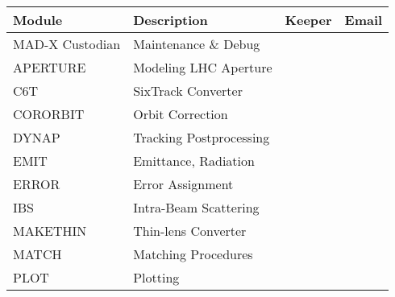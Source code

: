 %
\begin{table}[H]\vspace*{-6mm}\footnotesize
\begin{tabular}{l|l|l|l}
\hline
\textbf{Module}    &\textbf{Description}        &\textbf{Keeper}                     &\textbf{Email}            	 \\\hline
MAD-X Custodian    &Maintenance \& Debug        &{\color{green}{tba}}                            & {\color{red}{}}         \\\hline
APERTURE           &Modeling LHC Aperture       &{\color{green}{J.B.~Jeanneret}}                 & {\color{red}{Bernard.Jeanneret@cern.ch}}   \\ \hline                
C6T                &SixTrack Converter          &{\color{green}{F.~Schmidt}}                     & {\color{red}{Frank.Schmidt@cern.ch}}       \\\hline
CORORBIT           &Orbit Correction            &{\color{green}{W.~Herr}}                        & {\color{red}{Werner.Herr@cern.ch}}         \\\hline
DYNAP              &Tracking Postprocessing     &{\color{green}{F.~Zimmermann}}                  & {\color{red}{Frank.Zimmermann@cern.ch}}    \\\hline
EMIT               &Emittance, Radiation        &{\color{green}{R ~Tom\'as}}                     & {\color{red}{Rogelio.Tomas@cern.ch}}       \\\hline
ERROR              &Error Assignment            &{\color{green}{W.~Herr}}                        & {\color{red}{Werner.Herr@cern.ch}}         \\\hline
IBS                &Intra-Beam Scattering       &{\color{green}{F.~Zimmermann}}                  & {\color{red}{Frank.Zimmermann@cern.ch}}    \\\hline
MAKETHIN           &Thin-lens Converter         &{\color{green}{H.~Burkhardt}}                   & {\color{red}{Helmut.Burkhardt@cern.ch}}    \\\hline
MATCH              &Matching Procedures         &{\color{green}{O.~Br\"uning}}                   & {\color{red}{Oliver.Bruning@cern.ch}}      \\\hline
PLOT               &Plotting                    &{\color{green}{R.~de~Maria}}                    & {\color{red}{Riccardo.de.Maria@cern.ch}}   \\\hline

\end{tabular}
\end{table}
